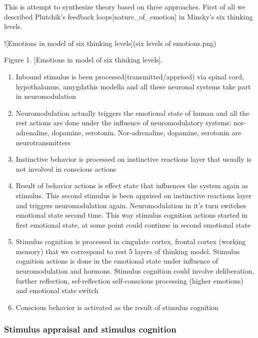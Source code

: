 This is attempt to synthesize theory based on three approaches. First of all we described Plutchik's feedback loops[nature_of_emotion] in Minsky's six thinking levels.

![Emotions in model of six thinking levels](six levels of emotions.png)

Figure 1. [Emotions in model of six thinking levels].

\begin{enumerate}
\item  Inbound stimulus is been processed(transmitted/apprised) via spinal cord, hypothalamus, amygdathis modella and all these neuronal systems take part in neuromodulation
\item  Neuromodulation actually triggers the emotional state of human and all the rest actions are done under the influence of neuromodulatory systems: nor-adrenaline, dopamine, serotonin. Nor-adrenaline, dopamine, serotonin are neurotransmitters
\item  Instinctive behavior is processed on instinctive reactions layer that usually is not involved in conscious actions
\item  Result of behavior actions is effect state that influences the system again as stimulus. This second stimulus is been apprised on instinctive reactions layer and triggers neuromodulation again. Neuromodulation in it's turn switches emotional state second time. This way stimulus cognition actions started in first emotional state, at some point could continue in second emotional state
\item  Stimulus cognition is processed in cingulate cortex, frontal cortex (working memory) that we correspond to rest 5 layers of thinking model. Stimulus cognition actions is done in the emotional state under influence of neuromodulation and hormons. Stimulus cognition could involve deliberation, further reflection, sef-reflection self-conscious processing (higher emotions) and  emotional state switch
\item  Conscious behavior is activated as the result of stimulus cognition
\end{enumerate}

\subsubsection{Stimulus appraisal and stimulus cognition}

